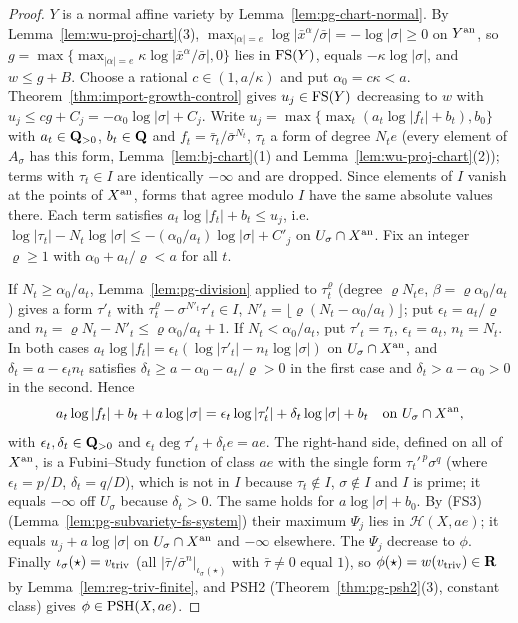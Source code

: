\begin{proof}
$Y$ is a normal affine variety by Lemma~\ref{lem:pg-chart-normal}. By Lemma~\ref{lem:wu-proj-chart}(3),
$\max_{|\alpha|=e}\log|\bar x^\alpha/\bar\sigma|=-\log|\sigma|\ge0$ on $Y^{\mathrm{an}}$, so $g=\max\{\max_{|\alpha|=e}\kappa\log|\bar x^\alpha/\bar\sigma|,0\}$ lies in
$\mathrm{FS}(Y)$, equals $-\kappa\log|\sigma|$, and $w\le g+B$. Choose a rational $c\in(1,a/\kappa)$ and put $\alpha_0=c\kappa<a$.
Theorem~\ref{thm:import-growth-control} gives $u_j\in\mathrm{FS}(Y)$ decreasing to $w$ with $u_j\le cg+C_j=-\alpha_0\log|\sigma|+C_j$. Write
$u_j=\max\{\max_t(a_t\log|f_t|+b_t),b_0\}$ with $a_t\in\mathbf{Q}_{>0}$, $b_t\in\mathbf{Q}$ and $f_t=\bar\tau_t/\bar\sigma^{N_t}$, $\tau_t$ a form of degree
$N_te$ (every element of $A_\sigma$ has this form, Lemma~\ref{lem:bj-chart}(1) and Lemma~\ref{lem:wu-proj-chart}(2)); terms with $\tau_t\in I$ are
identically $-\infty$ and are dropped. Since elements of $I$ vanish at the points of $X^{\mathrm{an}}$, forms that agree modulo $I$ have the same
absolute values there. Each term
satisfies $a_t\log|f_t|+b_t\le u_j$, i.e.\ $\log|\tau_t|-N_t\log|\sigma|\le-(\alpha_0/a_t)\log|\sigma|+C'_j$ on $U_\sigma\cap X^{\mathrm{an}}$. Fix an
integer $\varrho\ge1$ with $\alpha_0+a_t/\varrho<a$ for all $t$.

If $N_t\ge\alpha_0/a_t$, Lemma~\ref{lem:pg-division} applied to $\tau_t^\varrho$ (degree $\varrho N_te$, $\beta=\varrho\alpha_0/a_t$) gives a form $\tau'_t$ with
$\tau_t^\varrho-\sigma^{N'_t}\tau'_t\in I$, $N'_t=\lfloor\varrho(N_t-\alpha_0/a_t)\rfloor$; put $\epsilon_t=a_t/\varrho$ and $n_t=\varrho N_t-N'_t\le
\varrho\alpha_0/a_t+1$. If $N_t<\alpha_0/a_t$, put $\tau'_t=\tau_t$, $\epsilon_t=a_t$, $n_t=N_t$. In both cases
$a_t\log|f_t|=\epsilon_t(\log|\tau'_t|-n_t\log|\sigma|)$ on $U_\sigma\cap X^{\mathrm{an}}$, and $\delta_t=a-\epsilon_tn_t$ satisfies
$\delta_t\ge a-\alpha_0-a_t/\varrho>0$ in the first case and $\delta_t>a-\alpha_0>0$ in the second. Hence
\[
a_t\log|f_t|+b_t+a\log|\sigma|=\epsilon_t\log|\tau'_t|+\delta_t\log|\sigma|+b_t\quad\text{on }U_\sigma\cap X^{\mathrm{an}},
\]
with $\epsilon_t,\delta_t\in\mathbf{Q}_{>0}$ and $\epsilon_t\deg\tau'_t+\delta_te=ae$. The right-hand side, defined on all of $X^{\mathrm{an}}$, is a Fubini--Study
function of class $ae$ with the single form $\tau_t'^{\,p}\sigma^q$ (where $\epsilon_t=p/D$, $\delta_t=q/D$), which is not in $I$ because
$\tau_t\notin I$, $\sigma\notin I$ and $I$ is prime; it equals $-\infty$ off $U_\sigma$ because $\delta_t>0$. The same holds for
$a\log|\sigma|+b_0$. By (FS3) (Lemma~\ref{lem:pg-subvariety-fs-system}) their maximum $\Psi_j$ lies in $\mathcal H(X,ae)$; it equals
$u_j+a\log|\sigma|$ on $U_\sigma\cap X^{\mathrm{an}}$ and $-\infty$ elsewhere. The $\Psi_j$ decrease to $\phi$. Finally
$\iota_\sigma(\star)=v_{\mathrm{triv}}$ (all $|\bar\tau/\bar\sigma^n|_{\iota_\sigma(\star)}$ with $\bar\tau\ne0$ equal $1$), so
$\phi(\star)=w(v_{\mathrm{triv}})\in\mathbf{R}$ by Lemma~\ref{lem:reg-triv-finite}, and PSH2 (Theorem~\ref{thm:pg-psh2}(3), constant class) gives
$\phi\in\operatorname{PSH}(X,ae)$.
\end{proof}

